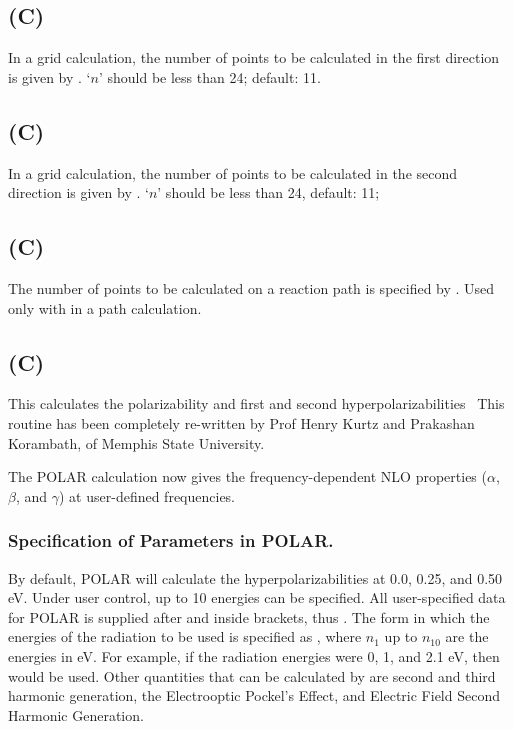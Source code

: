 \subsection*{ (C)}
In a grid calculation, the number of points to be calculated in  the
first  direction  is  given  by  .   `$n$'  should be less than 24;
default:  11.

\subsection*{ (C)}
In a grid calculation, the number of points to be calculated in  the
second  direction  is  given  by  .  `$n$' should be less than 24,
default:  11;

\subsection*{ (C)}
The number of  points  to  be  calculated  on  a  reaction  path  is
specified by .  Used only with  in a path calculation.


\subsection*{ (C)}

This calculates the polarizability and first and second
hyperpolarizabilities~\cite{polar}
 This routine has been completely re-written by Prof Henry Kurtz and
Prakashan Korambath, of Memphis State University.

 The POLAR calculation now gives the frequency-dependent
NLO properties ($\alpha$, $\beta$, and $\gamma$) at user-defined frequencies.

\subsubsection*{Specification of Parameters in POLAR.}
By default, POLAR will calculate the hyperpolarizabilities at 0.0, 0.25, and 0.50 eV.
Under user control, up to 10 energies can be specified.  All user-specified
data for POLAR is supplied after  and inside brackets,
thus . The form in which the energies of the
radiation to be used is specified as ,
where $n_1$ up to $n_{10}$ are the energies in eV.  For example, if the radiation
energies were 0, 1, and 2.1 eV, then  would be used.
Other quantities that can be calculated by  are second and third harmonic
generation, the Electrooptic Pockel's Effect, and Electric Field Second Harmonic
Generation.

